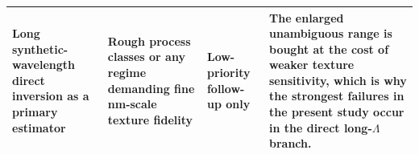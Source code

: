 \begin{table}[t]
\begin{tabularx}{\textwidth}{>{\RaggedRight\arraybackslash}p{2.6cm}>{\RaggedRight\arraybackslash}p{4.0cm}>{\RaggedRight\arraybackslash}p{2.5cm}>{\RaggedRight\arraybackslash}X}
Long synthetic-wavelength direct inversion as a primary estimator & Rough process classes or any regime demanding fine nm-scale texture fidelity & Low-priority follow-up only & The enlarged unambiguous range is bought at the cost of weaker texture sensitivity, which is why the strongest failures in the present study occur in the direct long-$\Lambda$ branch. \\
\bottomrule
\end{tabularx}
\end{table}